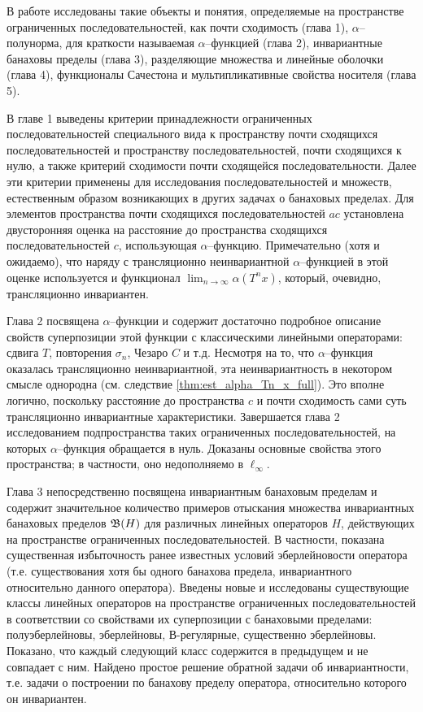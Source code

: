 В работе исследованы такие объекты и понятия, определяемые на пространстве ограниченных последовательностей,
как почти сходимость (глава 1), $\alpha$--полунорма, для краткости называемая $\alpha$--функцией (глава 2),
инвариантные банаховы пределы (глава 3), разделяющие множества и линейные оболочки (глава 4),
функционалы Сачестона и мультипликативные свойства носителя (глава 5).

В главе 1 выведены критерии принадлежности ограниченных последовательностей
специального вида к пространству почти сходящихся последовательностей
и пространству последовательностей, почти сходящихся к нулю,
а также критерий сходимости почти сходящейся последовательности.
Далее эти критерии применены для исследования последовательностей и множеств,
естественным образом возникающих в других задачах о банаховых пределах.
Для элементов пространства почти сходящихся последовательностей $ac $
установлена двусторонняя оценка на расстояние до пространства сходящихся последовательностей $c$,
использующая $\alpha$--функцию.
Примечательно (хотя и ожидаемо), что наряду с трансляционно неинвариантной $\alpha$--функцией
в этой оценке используется и функционал $\lim_{n\to\infty}\alpha(T^n x)$,
который, очевидно, трансляционно инвариантен.

Глава 2 посвящена $\alpha$--функции и содержит достаточно подробное описание
свойств суперпозиции этой функции с классическими линейными операторами:
сдвига $T$, повторения $\sigma_n$, Чезаро $C$ и т.д.
Несмотря на то, что $\alpha$--функция оказалась трансляционно неинвариантной,
эта неинвариантность в некотором смысле однородна (см. следствие \ref{thm:est_alpha_Tn_x_full}).
Это вполне логично, поскольку расстояние до пространства $c$ и почти сходимость
сами суть трансляционно инвариантные характеристики.
Завершается глава 2 исследованием подпространства таких ограниченных последовательностей,
на которых $\alpha$--функция обращается в нуль.
Доказаны основные свойства этого пространства;
в частности, оно недополняемо в $\ell_\infty$.

Глава 3 непосредственно посвящена инвариантным банаховым пределам и содержит
значительное количество примеров отыскания множества инвариантных банаховых пределов $\mathfrak{B}(H)$
для различных линейных операторов $H$, действующих на пространстве ограниченных последовательностей.
В частности, показана существенная избыточность ранее известных условий эберлейновости оператора
(т.е. существования хотя бы одного банахова предела, инвариантного относительно данного оператора).
Введены новые и исследованы существующие классы линейных операторов на пространстве ограниченных последовательностей
в соответствии со свойствами их суперпозиции с банаховыми пределами:
полуэберлейновы, эберлейновы, В-регулярные, существенно эберлейновы.
Показано, что каждый следующий класс содержится в предыдущем и не совпадает с ним.
Найдено простое решение обратной задачи об инвариантности,
т.е. задачи о построении по банахову пределу оператора, относительно которого он инвариантен.

